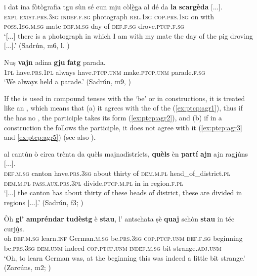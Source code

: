 \ea\label{ex:ptcp4}
\gll [...] i dat ina fòtògrafia tgu sùn sé cun mju còlè̱ga al dé da \textbf{la} \textbf{scargèda} [...].\\
{} \textsc{expl} \textsc{exist.prs.3sg}  \textsc{indef.f.sg} photograph \textsc{rel.1sg}  \textsc{cop.prs.1sg} on with  \textsc{poss.1sg.m.sg} mate \textsc{def.m.sg} day of \textsc{def.f.sg}  drove.\textsc{ptcp.f.sg} \\
\glt `[...] there is a photograph in which I am with my mate the day of the pig droving [...].' (Sadrún, m6, l. )
\z

\ea
\label{ex:dcomp:3}
\gll Nuṣ \textbf{vajn} adina \textbf{gju} \textbf{fatg} parada.   \\
\textsc{1pl} have.\textsc{prs.1pl} always have.\textsc{ptcp.unm} make.\textsc{ptcp.unm} parade.\textsc{f.sg}\\
\glt `We always held a parade.' (Sadrún, m9, )
\z

If the  is used in compound tenses with the   `be' or in  constructions, it is treated like an , which means that (a) it agrees with the  of the  (\ref{ex:ptcp:agr1}), thus if the  has no , the participle  takes its  form (\ref{ex:ptcp:agr2}), and (b) if in a  construction the  follows the participle, it does not agree with it (\ref{ex:ptcp:agr3} and \ref{ex:ptcp:agr5}) (see also ).

\ea\label{ex:ptcp:agr1}
\gll [...] al cantún ò circa trènta da quèls majnadistrícts, \textbf{quèls} èn \textbf{partí} \textbf{ajn}\footnotemark{} ajn ragjúns [...].  \\
{} \textsc{def.m.sg} canton  have.\textsc{prs.3sg} about thirty of \textsc{dem.m.pl} head\_of\_district.\textsc{pl} \textsc{dem.m.pl} \textsc{pass.aux.prs.3pl} divide.\textsc{ptcp.m.pl} in in region.\textsc{f.pl}\\
\glt `[...] the canton has about thirty of these heads of district, these are divided in regions [...].' (Sadrún, f3; )
\z

\ea\label{ex:ptcp:agr2}
\gll    Òh \textbf{gl’} \textbf{ampréndar} \textbf{tudèstg} è \textbf{stau}, l’ antschata ṣè \textbf{quaj} schòn \textbf{stau} in téc curjù̱s.\\
oh \textsc{def.m.sg} learn.\textsc{inf} German.\textsc{m.sg} be.\textsc{prs.3sg}  \textsc{cop.ptcp.unm} \textsc{def.f.sg} beginning be.\textsc{prs.3sg} \textsc{dem.unm} indeed \textsc{cop.ptcp.unm} \textsc{indef.m.sg} bit strange.\textsc{adj.unm}\\
\glt `Oh, to learn German was, at the beginning this was indeed a little bit strange.' (Zarcúns, m2; )
\z

